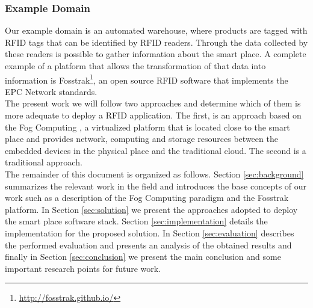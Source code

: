 \subsubsection{Example Domain}
\label{subs:domain}
Our example domain is an automated warehouse, where products are tagged with \gls{RFID} tags that
can be identified by \gls{RFID} readers. Through the data collected by these readers is possible to
gather information about the smart place. A complete example of a platform that allows the transformation
of that data into information is Fosstrak\footnote{\url{http://fosstrak.github.io/}}, an open
source \gls{RFID} software that implements the \gls{EPC} Network standards.\\

The present work we will follow two approaches and determine which of them is more adequate to
deploy a \gls{RFID} application. The first, is an approach based on the Fog Computing \cite{bonomi2012fog},
a virtualized platform that is located close to the smart place and provides network, computing and storage
resources between the embedded devices in the physical place and the traditional cloud. The second is
a traditional approach.\\

The remainder of this document is organized as follows. Section \ref{sec:background} summarizes the
relevant work in the field and introduces the base concepts of our work such as a description of the
Fog Computing paradigm and the Fosstrak platform. In Section \ref{sec:solution} we present the approaches
adopted to deploy the smart place software stack. Section \ref{sec:implementation} details the
implementation for the proposed solution. In Section \ref{sec:evaluation} describes the performed
evaluation and presents an analysis of the obtained results and finally in Section \ref{sec:conclusion}
we present the main conclusion and some important research points for future work.
